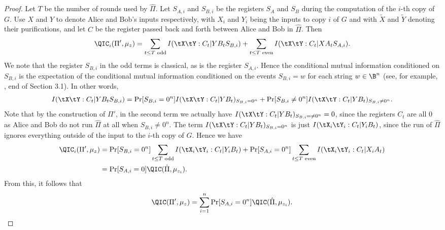\begin{proof}
Let $T$ be the number of rounds used by $\hat{\Pi}$.
Let $S_{A,i}$ and $S_{B,i}$ be the registers $S_A$ and $S_B$
during the computation of the $i$-th copy of $G$. 
Use $X$ and $Y$ to denote Alice and Bob's inputs respectively,
with $X_i$ and $Y_i$ being the inputs to copy $i$ of $G$
and with $\tilde{X}$ and $\tilde{Y}$ denoting their purifications,
and let $C$ be the register passed back and forth between
Alice and Bob in $\hat{\Pi}$. Then
\[\QIC_i(\Pi',\mu_z)=
\sum_{t\le T\text{ odd}} I(\tX\tY:C_t|YB_t S_{B,i})
+\sum_{t\le T\text{ even}}I(\tX\tY:C_t|XA_t S_{A,i}).\]
We note that the register $S_{B,i}$ in the odd terms is classical,
as is the register $S_{A,i}$. Hence the conditional
mutual information conditioned on $S_{B,i}$ is the expectation
of the conditional mutual information conditioned on the events
$S_{B,i}=w$ for each string $w\in\B^n$ (see, for example,
\cite{BGK+18}, end of Section 3.1). In other words,
\[I(\tX\tY:C_t|YB_t S_{B,i})=
\Pr[S_{B,i}=0^n] I(\tX\tY:C_t|YB_t)_{S_{B,i}=0^n}
+\Pr[S_{B,i}\ne 0^n] I(\tX\tY:C_t|YB_t)_{S_{B,i}\ne 0^n}.\]
Note that by the construction of $\Pi'$, in the second term
we actually have $I(\tX\tY:C_t|YB_t)_{S_{B,i}=\ne 0^n}=0$,
since the registers $C_t$ are all $0$ as Alice and Bob do not
run $\hat{\Pi}$ at all when $S_{B,i}\ne 0^n$.
The term $I(\tX\tY:C_t|YB_t)_{S_{B,i}=0^n}$
is just $I(\tX_i\tY_i:C_t|Y_iB_t)$, since
the run of $\hat{\Pi}$ ignores everything outside of the input
to the $i$-th copy of $G$. Hence we have
\begin{align*}
\QIC_i(\Pi',\mu_z)&=
\Pr[S_{B,i}=0^n]\sum_{t\le T\text{ odd}}I(\tX_i\tY_i:C_t|Y_iB_t)
+\Pr[S_{A,i}=0^n]
\sum_{t\le T\text{ even}}I(\tX_i\tY_i:C_t|X_iA_t)\\
&=\Pr[S_{A,i}=0]\QIC(\hat{\Pi},\mu_{z_i}).
\end{align*}
From this, it follows that
\[\QIC(\Pi',\mu_z)=\sum_{i=1}^n \Pr[S_{A,i}=0^n]\QIC(\hat{\Pi},\mu_{z_i}).\]


\end{proof}
